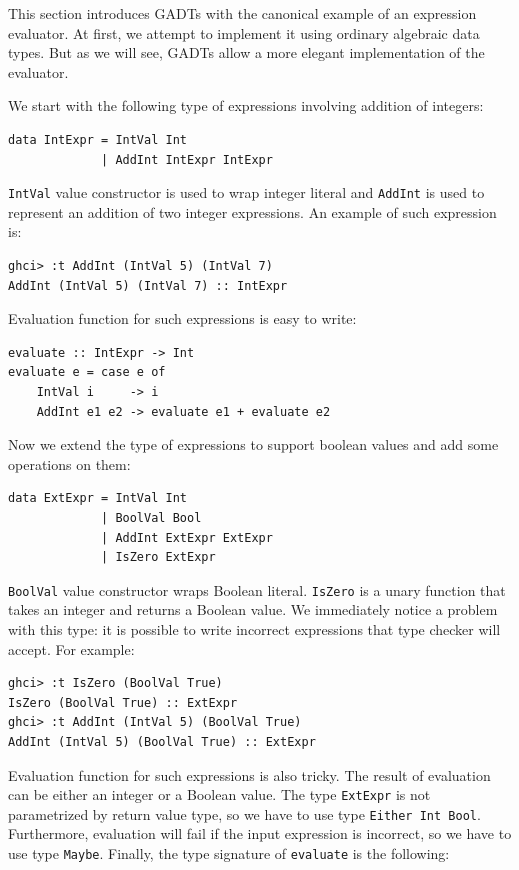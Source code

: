 \documentclass{tmr}
\begin{document}
This section introduces GADTs with the canonical example of an expression evaluator. At first, we attempt to implement it using ordinary algebraic data types. But as we will see, GADTs allow a more elegant implementation of the evaluator.

We start with the following type of expressions involving addition of integers:

\begin{Verbatim}
data IntExpr = IntVal Int
             | AddInt IntExpr IntExpr
\end{Verbatim}

\verb|IntVal| value constructor is used to wrap integer literal and \verb|AddInt| is used to represent an addition of two integer expressions. An example of such expression is:

\begin{Verbatim}
ghci> :t AddInt (IntVal 5) (IntVal 7)
AddInt (IntVal 5) (IntVal 7) :: IntExpr
\end{Verbatim}

Evaluation function for such expressions is easy to write:

\begin{Verbatim}
evaluate :: IntExpr -> Int
evaluate e = case e of
    IntVal i     -> i
    AddInt e1 e2 -> evaluate e1 + evaluate e2
\end{Verbatim}

Now we extend the type of expressions to support boolean values and add some operations on them:

\begin{Verbatim}
data ExtExpr = IntVal Int
             | BoolVal Bool
             | AddInt ExtExpr ExtExpr
             | IsZero ExtExpr
\end{Verbatim}

\verb|BoolVal| value constructor wraps Boolean literal. \verb|IsZero| is a unary function that takes an integer and returns a Boolean value. We immediately notice a problem with this type: it is possible to write incorrect expressions that type checker will accept. For example:

\begin{Verbatim}
ghci> :t IsZero (BoolVal True)
IsZero (BoolVal True) :: ExtExpr
ghci> :t AddInt (IntVal 5) (BoolVal True)
AddInt (IntVal 5) (BoolVal True) :: ExtExpr
\end{Verbatim}

Evaluation function for such expressions is also tricky. The result of evaluation can be either an integer or a Boolean value. The type \verb|ExtExpr| is not parametrized by return value type, so we have to use type \verb|Either Int Bool|. Furthermore, evaluation will fail if the input expression is incorrect, so we have to use type \verb|Maybe|. Finally, the type signature of \verb|evaluate| is the following:
\end{document}
